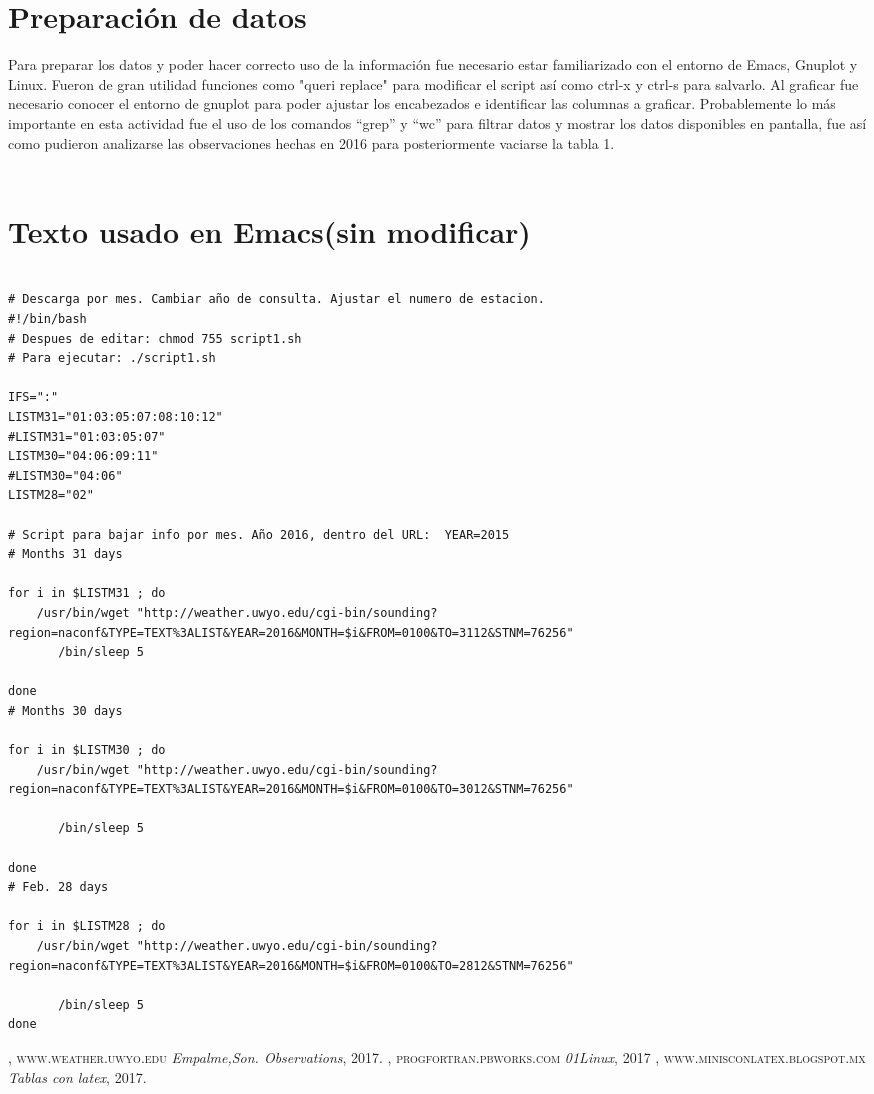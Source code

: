 \documentclass[11pt]{article}
\begin{document}
\section*{Preparación de datos}
Para preparar los datos y poder hacer correcto uso de la información fue necesario estar familiarizado con el entorno de Emacs, Gnuplot y Linux. Fueron de gran utilidad funciones como "queri replace" para modificar el script así como ctrl-x y ctrl-s para salvarlo. Al graficar fue necesario conocer el entorno de gnuplot para poder ajustar los encabezados e identificar las columnas a graficar. Probablemente lo más importante en esta actividad fue el uso de los comandos “grep” y “wc” para filtrar datos y mostrar los datos disponibles en pantalla, fue así como pudieron analizarse las observaciones hechas en 2016 para posteriormente vaciarse la tabla 1. \\
\\
\section*{Texto usado en Emacs(sin modificar)}
\begin{verbatim}

# Descarga por mes. Cambiar año de consulta. Ajustar el numero de estacion.
#!/bin/bash
# Despues de editar: chmod 755 script1.sh
# Para ejecutar: ./script1.sh

IFS=":"
LISTM31="01:03:05:07:08:10:12"
#LISTM31="01:03:05:07"
LISTM30="04:06:09:11"
#LISTM30="04:06"
LISTM28="02"

# Script para bajar info por mes. Año 2016, dentro del URL:  YEAR=2015
# Months 31 days

for i in $LISTM31 ; do
    /usr/bin/wget "http://weather.uwyo.edu/cgi-bin/sounding?region=naconf&TYPE=TEXT%3ALIST&YEAR=2016&MONTH=$i&FROM=0100&TO=3112&STNM=76256"
       /bin/sleep 5

done
# Months 30 days

for i in $LISTM30 ; do
    /usr/bin/wget "http://weather.uwyo.edu/cgi-bin/sounding?region=naconf&TYPE=TEXT%3ALIST&YEAR=2016&MONTH=$i&FROM=0100&TO=3012&STNM=76256"

       /bin/sleep 5

done
# Feb. 28 days

for i in $LISTM28 ; do
    /usr/bin/wget "http://weather.uwyo.edu/cgi-bin/sounding?region=naconf&TYPE=TEXT%3ALIST&YEAR=2016&MONTH=$i&FROM=0100&TO=2812&STNM=76256"

       /bin/sleep 5
done
\end{verbatim}
\renewcommand{\refname}{Bibliografía}
\begin{thebibliography}{9}
, \textsc{www.weather.uwyo.edu}
\textit{Empalme,Son. Observations}, 2017.
, \textsc{progfortran.pbworks.com}
\textit{01Linux}, 2017
, \textsc{www.minisconlatex.blogspot.mx}
\textit{Tablas con latex}, 2017.
\end{thebibliography}
\end{document}

